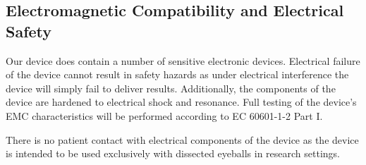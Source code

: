 \subsection{Electromagnetic Compatibility and Electrical Safety}

Our device does contain a number of sensitive electronic
devices. Electrical failure of the device cannot result in safety
hazards as under electrical interference the device will simply fail
to deliver results. Additionally, the components of the device are
hardened to electrical shock and resonance. Full testing of the
device's EMC characteristics will be performed according to EC
60601-1-2 Part I.

There is no patient contact with electrical components of the device
as the device is intended to be used exclusively with dissected
eyeballs in research settings.


